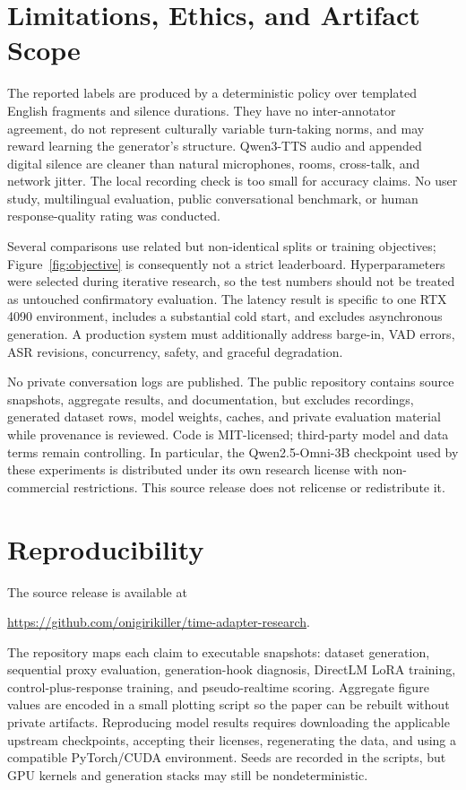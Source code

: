 \documentclass[10pt,twocolumn]{article}
\begin{document}
\section{Limitations, Ethics, and Artifact Scope}

The reported labels are produced by a deterministic policy over templated English fragments and silence durations. They have no inter-annotator agreement, do not represent culturally variable turn-taking norms, and may reward learning the generator's structure. Qwen3-TTS audio and appended digital silence are cleaner than natural microphones, rooms, cross-talk, and network jitter. The local recording check is too small for accuracy claims. No user study, multilingual evaluation, public conversational benchmark, or human response-quality rating was conducted.

Several comparisons use related but non-identical splits or training objectives; Figure~\ref{fig:objective} is consequently not a strict leaderboard. Hyperparameters were selected during iterative research, so the test numbers should not be treated as untouched confirmatory evaluation. The latency result is specific to one RTX 4090 environment, includes a substantial cold start, and excludes asynchronous generation. A production system must additionally address barge-in, VAD errors, ASR revisions, concurrency, safety, and graceful degradation.

No private conversation logs are published. The public repository contains source snapshots, aggregate results, and documentation, but excludes recordings, generated dataset rows, model weights, caches, and private evaluation material while provenance is reviewed. Code is MIT-licensed; third-party model and data terms remain controlling. In particular, the Qwen2.5-Omni-3B checkpoint used by these experiments is distributed under its own research license with non-commercial restrictions. This source release does not relicense or redistribute it.

\section{Reproducibility}

The source release is available at
\begin{center}
\url{https://github.com/onigirikiller/time-adapter-research}.
\end{center}
The repository maps each claim to executable snapshots: dataset generation, sequential proxy evaluation, generation-hook diagnosis, DirectLM LoRA training, control-plus-response training, and pseudo-realtime scoring. Aggregate figure values are encoded in a small plotting script so the paper can be rebuilt without private artifacts. Reproducing model results requires downloading the applicable upstream checkpoints, accepting their licenses, regenerating the data, and using a compatible PyTorch/CUDA environment. Seeds are recorded in the scripts, but GPU kernels and generation stacks may still be nondeterministic.
\end{document}
